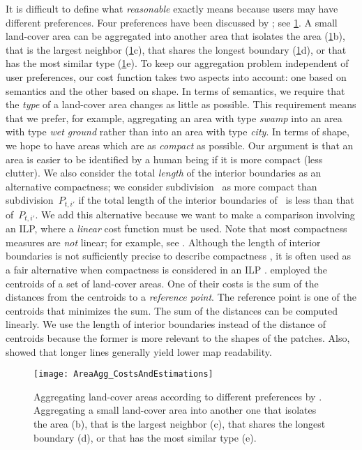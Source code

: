 \documentclass[acmsmall,natbib=false]{acmart}
\begin{document}
It is difficult to define what \emph{reasonable} exactly means 
because users may have different preferences.
Four preferences have been discussed by
\textcite{Cheng2006}; see \fig\ref{fig:AreaAgg_Preferences}.
A small land-cover area can be aggregated into another area 
that isolates the area 
(\fig\ref{fig:AreaAgg_Preferences}b), 
that is the largest neighbor 
(\fig\ref{fig:AreaAgg_Preferences}c), 
that shares the longest boundary 
(\fig\ref{fig:AreaAgg_Preferences}d), or 
that has the most similar type
(\fig\ref{fig:AreaAgg_Preferences}e).
To keep our aggregation problem independent of user preferences,
our cost function takes two aspects into account: 
one based on semantics and 
the other based on shape.
%
In terms of semantics, we require that 
the \emph{type} of a land-cover area changes 
as little as possible.
This requirement means that we prefer, for example, 
aggregating an area with type \emph{swamp} 
into an area with type \emph{wet ground} 
rather than into an area with type \emph{city}.
%
In terms of shape, we hope to have areas 
which are as \emph{compact} as possible.
Our argument is that an area is easier 
to be identified by a human being 
if it is more compact (less clutter).
%
We also consider the total \emph{length} 
of the interior boundaries as an alternative compactness;
we consider subdivision~\Pnode 
as more compact than subdivision~$P_{t,i'}$ 
if the total length of the interior boundaries of~\Pnode 
is less than that of~$P_{t,i'}$.
We add this alternative because we want to make a comparison 
involving an ILP, 
where a \emph{linear} cost function must be used.
Note that most compactness measures
are \emph{not} linear;
for example, see \textcite{Maceachren1985,Li2013Compactness}.
Although the length of interior boundaries 
is not sufficiently precise 
to describe compactness \parencite{Young1988},
it is often used as a fair alternative
when compactness is considered in an ILP
\parencite[e.g.,][]{Minas2016,Wright1983}.
\textcite{HaunertWolff2010AreaAgg} employed 
the centroids of a set of land-cover areas.
One of their costs is the sum of the distances 
from the centroids to a \emph{reference point}.
The reference point is one of the centroids
that minimizes the sum.
The sum of the distances can be computed linearly.
We use the length of interior boundaries 
instead of the distance of centroids because the former 
is more relevant to the shapes of the patches.
Also, \textcite{Harrie2015Readability} showed that
longer lines generally yield lower map readability.

\begin{figure}[tb]
\centering
\texttt{[image: AreaAgg\_CostsAndEstimations]}
\caption{Aggregating land-cover areas 
	according to different preferences
    by \textcite{Cheng2006}.
	Aggregating a small land-cover area into another one 
	that isolates the area (b), 
	that is the largest neighbor (c), 
	that shares the longest boundary (d), or 
	that has the most similar type (e).}
\label{fig:AreaAgg_Preferences}	
\end{figure}
\end{document}
